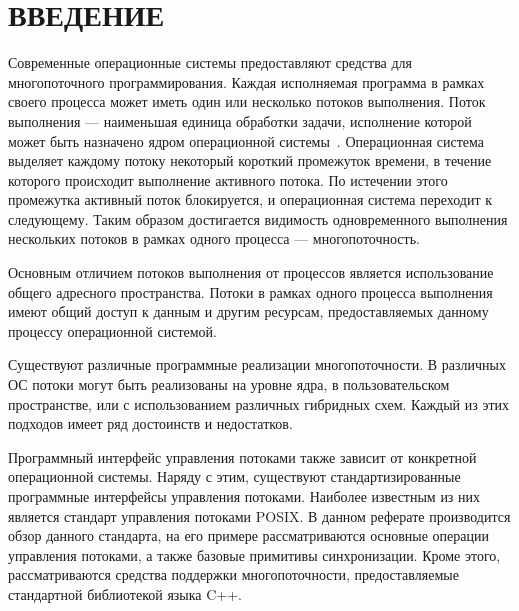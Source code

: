 \section*{ВВЕДЕНИЕ}

Современные операционные системы предоставляют средства для
многопоточного программирования.
Каждая исполняемая программа в рамках своего процесса
может иметь один или несколько потоков выполнения.
Поток выполнения --- наименьшая единица обработки задачи,
исполнение которой может быть назначено ядром операционной
системы~\cite{wiki_thread}.
Операционная система выделяет каждому потоку некоторый короткий
промежуток времени, в течение которого происходит выполнение
активного потока. По истечении этого промежутка активный
поток блокируется, и операционная система переходит к следующему.
Таким образом достигается видимость одновременного выполнения
нескольких потоков в рамках одного процесса --- многопоточность.

Основным отличием потоков выполнения от процессов является
использование общего адресного пространства.
Потоки в рамках одного процесса выполнения имеют общий доступ к данным
и другим ресурсам, предоставляемых данному процессу операционной системой.

Существуют различные программные реализации многопоточности.
В различных ОС потоки могут быть реализованы на уровне ядра,
в пользовательском пространстве, или с использованием различных гибридных схем.
Каждый из этих подходов имеет ряд достоинств и недостатков.

Программный интерфейс управления потоками также зависит от конкретной
операционной системы. Наряду с этим, существуют стандартизированные
программные интерфейсы управления потоками.
Наиболее известным из них является стандарт управления потоками POSIX.
В данном реферате производится обзор данного стандарта,
на его примере рассматриваются основные операции
управления потоками, а также базовые примитивы синхронизации.
Кроме этого, рассматриваются средства поддержки многопоточности,
предоставляемые стандартной библиотекой языка C++.

